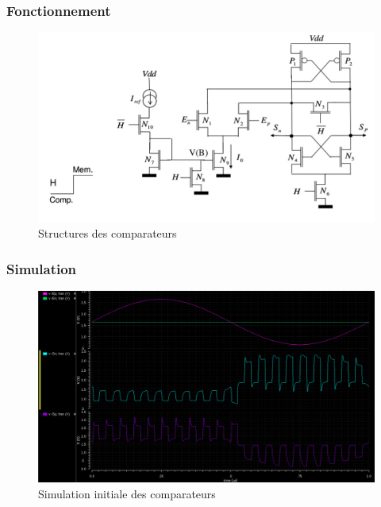 \documentclass{beamer}
\begin{document}
\begin{frame}
\frametitle{Fonctionnement}

\begin{figure}[!htb]
  \includegraphics[width=0.8\linewidth]{comparateur_schema.jpg}
  \caption{Structures des comparateurs}
\end{figure}

\end{frame}


\begin{frame}
\frametitle{Simulation}

\begin{figure}[!htb]
  \includegraphics[width=0.9\linewidth]{simu_comp_pas_ameliore.png}
  \caption{Simulation initiale des comparateurs}
\end{figure}

\end{frame}

\end{document}
